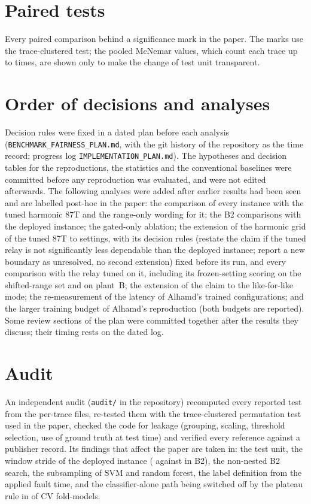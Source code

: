 \documentclass[11pt]{article}
\begin{document}
\section{Paired tests}
\label{sec:S3}
Every paired comparison behind a significance mark in the paper. The marks use the trace-clustered test; the pooled McNemar values, which count each trace up to \nSeeds{} times, are shown only to make the change of test unit transparent.








\section{Order of decisions and analyses}
\label{sec:S8}
Decision rules were fixed in a dated plan before each analysis (\texttt{BENCHMARK\_FAIRNESS\_PLAN.md}, with the git history of the repository as the time record; progress log \texttt{IMPLEMENTATION\_PLAN.md}). The hypotheses and decision tables for the reproductions, the statistics and the conventional baselines were committed before any reproduction was evaluated, and were not edited afterwards. The following analyses were added after earlier results had been seen and are labelled post-hoc in the paper: the comparison of every instance with the tuned harmonic 87T and the range-only wording for it; the B2 comparisons with the deployed instance; the gated-only ablation; the extension of the harmonic grid of the tuned 87T to \nGridX{} settings, with its decision rules (restate the claim if the tuned relay is not significantly less dependable than the deployed instance; report a new boundary as unresolved, no second extension) fixed before its run, and every comparison with the relay tuned on it, including its frozen-setting scoring on the shifted-range set and on plant~B; the extension of the claim to the like-for-like mode; the re-measurement of the latency of Alhamd's trained configurations; and the larger training budget of Alhamd's reproduction (both budgets are reported). Some review sections of the plan were committed together after the results they discuss; their timing rests on the dated log.

\section{Audit}
\label{sec:S9}
An independent audit (\texttt{audit/} in the repository) recomputed every reported test from the per-trace files, re-tested them with the trace-clustered permutation test used in the paper, checked the code for leakage (grouping, scaling, threshold selection, use of ground truth at test time) and verified every reference against a publisher record. Its findings that affect the paper are taken in: the test unit, the window stride of the deployed instance (\strideDep{} against \strideBtwo{} in B2), the non-nested B2 search, the subsampling of SVM and random forest, the label definition from the applied fault time, and the classifier-alone path being switched off by the plateau rule in \soloOff{} of \nFoldModels{} CV fold-models.
\end{document}
